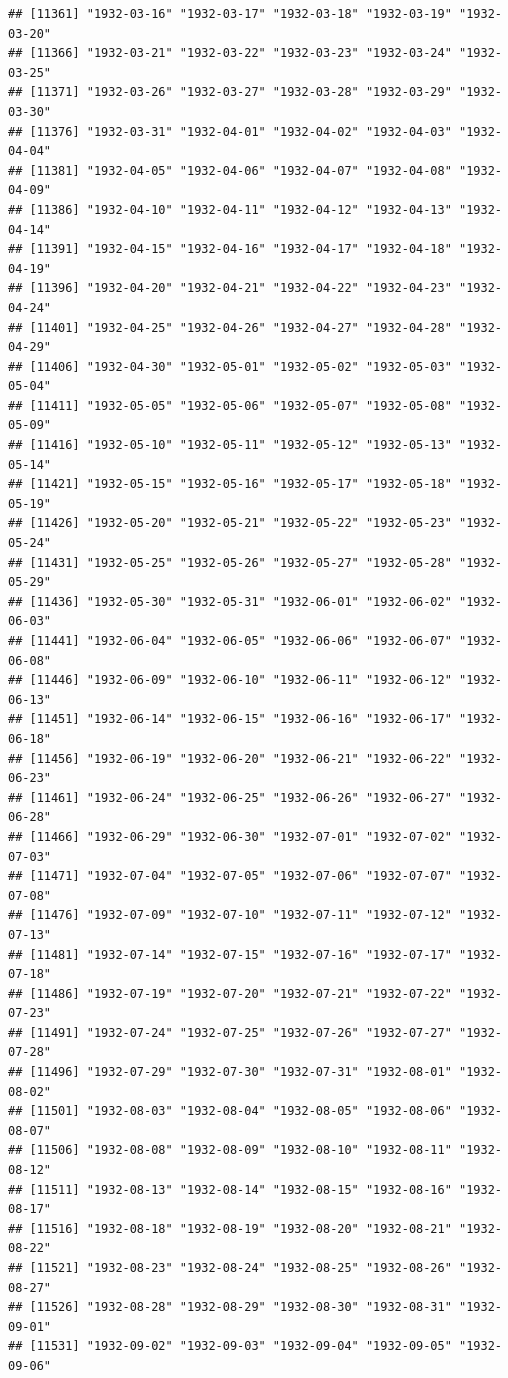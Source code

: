 \documentclass{article}\usepackage[]{graphicx}\usepackage[]{color}
\makeatletter
\newenvironment{kframe}{%
 \def\at@end@of@kframe{}%
 \ifinner\ifhmode%
  \def\at@end@of@kframe{\end{minipage}}%
  \begin{minipage}{\columnwidth}%
 \fi\fi%
 \def\FrameCommand##1{\hskip\@totalleftmargin \hskip-\fboxsep
 \colorbox{shadecolor}{##1}\hskip-\fboxsep
     \hskip-\linewidth \hskip-\@totalleftmargin \hskip\columnwidth}%
 \MakeFramed {\advance\hsize-\width
   \@totalleftmargin\z@ \linewidth\hsize
   \@setminipage}}%
 {\par\unskip\endMakeFramed%
 \at@end@of@kframe}
\newenvironment{knitrout}{}{} %
\makeatother
\begin{document}
\begin{description}
\begin{knitrout}
\begin{kframe}
\begin{verbatim}
## [11361] "1932-03-16" "1932-03-17" "1932-03-18" "1932-03-19" "1932-03-20"
## [11366] "1932-03-21" "1932-03-22" "1932-03-23" "1932-03-24" "1932-03-25"
## [11371] "1932-03-26" "1932-03-27" "1932-03-28" "1932-03-29" "1932-03-30"
## [11376] "1932-03-31" "1932-04-01" "1932-04-02" "1932-04-03" "1932-04-04"
## [11381] "1932-04-05" "1932-04-06" "1932-04-07" "1932-04-08" "1932-04-09"
## [11386] "1932-04-10" "1932-04-11" "1932-04-12" "1932-04-13" "1932-04-14"
## [11391] "1932-04-15" "1932-04-16" "1932-04-17" "1932-04-18" "1932-04-19"
## [11396] "1932-04-20" "1932-04-21" "1932-04-22" "1932-04-23" "1932-04-24"
## [11401] "1932-04-25" "1932-04-26" "1932-04-27" "1932-04-28" "1932-04-29"
## [11406] "1932-04-30" "1932-05-01" "1932-05-02" "1932-05-03" "1932-05-04"
## [11411] "1932-05-05" "1932-05-06" "1932-05-07" "1932-05-08" "1932-05-09"
## [11416] "1932-05-10" "1932-05-11" "1932-05-12" "1932-05-13" "1932-05-14"
## [11421] "1932-05-15" "1932-05-16" "1932-05-17" "1932-05-18" "1932-05-19"
## [11426] "1932-05-20" "1932-05-21" "1932-05-22" "1932-05-23" "1932-05-24"
## [11431] "1932-05-25" "1932-05-26" "1932-05-27" "1932-05-28" "1932-05-29"
## [11436] "1932-05-30" "1932-05-31" "1932-06-01" "1932-06-02" "1932-06-03"
## [11441] "1932-06-04" "1932-06-05" "1932-06-06" "1932-06-07" "1932-06-08"
## [11446] "1932-06-09" "1932-06-10" "1932-06-11" "1932-06-12" "1932-06-13"
## [11451] "1932-06-14" "1932-06-15" "1932-06-16" "1932-06-17" "1932-06-18"
## [11456] "1932-06-19" "1932-06-20" "1932-06-21" "1932-06-22" "1932-06-23"
## [11461] "1932-06-24" "1932-06-25" "1932-06-26" "1932-06-27" "1932-06-28"
## [11466] "1932-06-29" "1932-06-30" "1932-07-01" "1932-07-02" "1932-07-03"
## [11471] "1932-07-04" "1932-07-05" "1932-07-06" "1932-07-07" "1932-07-08"
## [11476] "1932-07-09" "1932-07-10" "1932-07-11" "1932-07-12" "1932-07-13"
## [11481] "1932-07-14" "1932-07-15" "1932-07-16" "1932-07-17" "1932-07-18"
## [11486] "1932-07-19" "1932-07-20" "1932-07-21" "1932-07-22" "1932-07-23"
## [11491] "1932-07-24" "1932-07-25" "1932-07-26" "1932-07-27" "1932-07-28"
## [11496] "1932-07-29" "1932-07-30" "1932-07-31" "1932-08-01" "1932-08-02"
## [11501] "1932-08-03" "1932-08-04" "1932-08-05" "1932-08-06" "1932-08-07"
## [11506] "1932-08-08" "1932-08-09" "1932-08-10" "1932-08-11" "1932-08-12"
## [11511] "1932-08-13" "1932-08-14" "1932-08-15" "1932-08-16" "1932-08-17"
## [11516] "1932-08-18" "1932-08-19" "1932-08-20" "1932-08-21" "1932-08-22"
## [11521] "1932-08-23" "1932-08-24" "1932-08-25" "1932-08-26" "1932-08-27"
## [11526] "1932-08-28" "1932-08-29" "1932-08-30" "1932-08-31" "1932-09-01"
## [11531] "1932-09-02" "1932-09-03" "1932-09-04" "1932-09-05" "1932-09-06"

\end{verbatim}
\end{kframe}
\end{knitrout}
\end{description}
\end{document}
